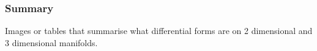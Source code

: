 
\subsubsection*{Summary}
Images or tables that summarise what differential forms are on 2 dimensional and 3 dimensional manifolds. 

%

